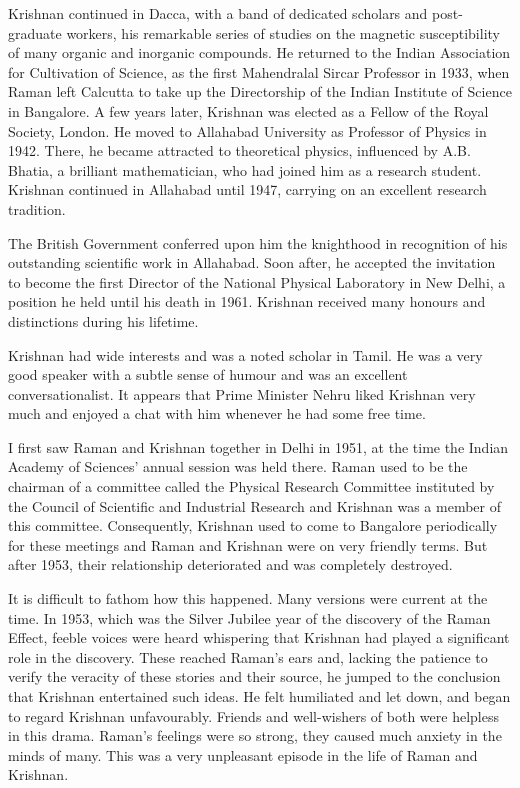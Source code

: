 Krishnan continued in Dacca, with a band of dedicated scholars and post-graduate workers, his remarkable series of studies on the magnetic susceptibility of many organic and inorganic compounds. He returned to the Indian Association for Cultivation of Science, as the first Mahendralal Sircar Professor in 1933, when Raman left Calcutta to take up the Directorship of the Indian Institute of Science in Bangalore. A few years later, Krishnan was elected as a Fellow of the Royal Society, London. He moved to Allahabad University as Professor of Physics in 1942. There, he became attracted to theoretical physics, influenced
by A.B. Bhatia, a brilliant mathematician, who had joined him as a research student. Krishnan continued in Allahabad until 1947, carrying on an excellent research tradition.

The British Government conferred upon him the knighthood in recognition of his outstanding scientific work in Allahabad. Soon after, he accepted the invitation to become the first Director of the National Physical Laboratory in New Delhi, a position he held until his death in 1961. Krishnan received many honours and distinctions during his lifetime.

Krishnan had wide interests and was a noted scholar in Tamil. He was a very good speaker with a subtle sense of humour and was an excellent conversationalist. It appears that Prime Minister Nehru liked Krishnan very much and enjoyed a chat with him whenever he had some free time.

I first saw Raman and Krishnan together in Delhi in 1951, at the time the Indian Academy of Sciences' annual session was held there. Raman used to be the chairman of a committee called the Physical Research Committee instituted by the Council of Scientific and Industrial Research and Krishnan was a member of this committee. Consequently, Krishnan used to come to Bangalore periodically for these meetings and Raman and Krishnan were on very friendly terms. But after 1953, their relationship deteriorated and was completely destroyed.

\newpage

It is difficult to fathom how this happened. Many versions were current at the time. In 1953, which was the Silver Jubilee year of the discovery of the Raman Effect, feeble voices were heard whispering that Krishnan had played a significant role in the discovery. These reached Raman's ears and, lacking the patience to verify the veracity of these stories and their source, he jumped to the conclusion that Krishnan entertained such ideas. He felt humiliated and let down, and began to regard Krishnan unfavourably. Friends and well-wishers of both were helpless in this drama. Raman's feelings were so strong, they caused much anxiety in the minds of many. This was a very unpleasant episode in the life of Raman and Krishnan.

